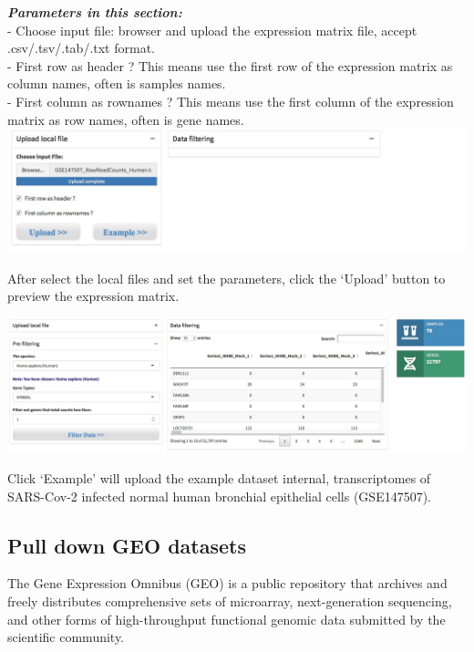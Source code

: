 \documentclass[
  a4paper,
  oneside]{book}
\begin{document}
\textbf{\emph{Parameters in this section:}}\\
- Choose input file: browser and upload the expression matrix file, accept .csv/.tsv/.tab/.txt format.\\
- First row as header ? This means use the first row of the expression matrix as column names, often is samples names.\\
- First column as rownames ? This means use the first column of the expression matrix as row names, often is gene names.\\

\includegraphics{images/upload_local_file.jpeg}

After select the local files and set the parameters, click the `Upload' button to preview the expression matrix.

\includegraphics{images/local_expression_preview.jpeg}

Click `Example' will upload the example dataset internal, transcriptomes of SARS-Cov-2 infected normal human bronchial epithelial cells (GSE147507).

\hypertarget{pull-down-geo-datasets}{%
\subsection{Pull down GEO datasets}\label{pull-down-geo-datasets}}

The Gene Expression Omnibus (GEO) is a public repository that archives and freely distributes comprehensive sets of microarray, next-generation sequencing, and other forms of high-throughput functional genomic data submitted by the scientific community.
\end{document}
